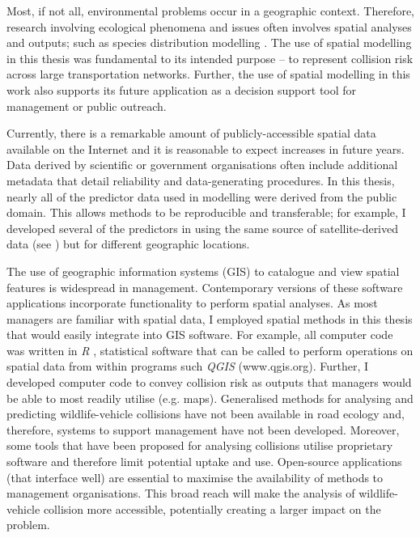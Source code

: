 Most, if not all, environmental problems occur in a geographic context. Therefore, research involving ecological phenomena and issues often involves spatial analyses and outputs; such as species distribution modelling \citep[e.g.][]{elit09}. The use of spatial modelling in this thesis was fundamental to its intended purpose -- to represent collision risk across large transportation networks. Further, the use of spatial modelling in this work also supports its future application as a decision support tool for management or public outreach.


Currently, there is a remarkable amount of publicly-accessible spatial data available on the Internet \citep{ma15} and it is reasonable to expect increases in future years. Data derived by scientific or government organisations often include additional metadata that detail reliability and data-generating procedures. In this thesis, nearly all of the predictor data used in modelling were derived from the public domain. This allows methods to be reproducible and transferable; for example, I developed several of the predictors in  using the same source of satellite-derived data (see ) but for different geographic locations.


The use of geographic information systems (GIS) to catalogue and view spatial features is widespread in management. Contemporary versions of these software applications incorporate functionality to perform spatial analyses. As most managers are familiar with spatial data, I employed spatial methods in this thesis that would easily integrate into GIS software. For example, all computer code was written in \textit{R} \citep{rdct16}, statistical software that can be called to perform operations on spatial data from within programs such \textit{QGIS} (www.qgis.org). Further, I developed computer code to convey collision risk as outputs that managers would be able to most readily utilise (e.g. maps). Generalised methods for analysing and predicting wildlife-vehicle collisions have not been available in road ecology and, therefore, systems to support management have not been developed. Moreover, some tools that have been proposed for analysing collisions utilise proprietary software and therefore limit potential uptake and use. Open-source applications (that interface well) are essential to maximise the availability of methods to management organisations. This broad reach will make the analysis of wildlife-vehicle collision more accessible, potentially creating a larger impact on the problem.


